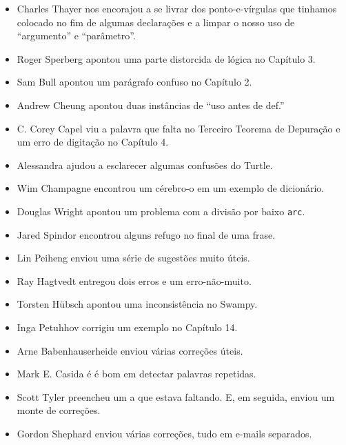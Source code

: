 \documentclass[10pt]{book}
\begin{document}
\begin {itemize}
\item Charles Thayer nos encorajou a se livrar dos ponto-e-vírgulas %
que tinhamos colocado no fim de algumas declarações e a limpar o nosso
uso de ``argumento'' e ``parâmetro''.

\item Roger Sperberg apontou uma parte distorcida de lógica no Capítulo 3. %

\item Sam Bull apontou um parágrafo confuso no Capítulo 2. %

\item Andrew Cheung apontou duas instâncias de ``uso antes de def.'' %

\item C. Corey Capel viu a palavra que falta no Terceiro Teorema
de Depuração e um erro de digitação no Capítulo 4.

\item Alessandra ajudou a esclarecer algumas confusões do Turtle.

\item Wim Champagne encontrou um cérebro-o em um exemplo de dicionário. %

\item Douglas Wright apontou um problema com a divisão por baixo %
{\tt arc}.

\item Jared Spindor encontrou alguns refugo no final de uma frase. %

\item Lin Peiheng enviou uma série de sugestões muito úteis.

\item Ray Hagtvedt entregou dois erros e um erro-não-muito. %

\item Torsten H\"{u}bsch apontou uma inconsistência no Swampy. %

\item Inga Petuhhov corrigiu um exemplo no Capítulo 14.

\item Arne Babenhauserheide enviou várias correções úteis.

\item Mark E. Casida é é bom em detectar palavras repetidas.

\item Scott Tyler preencheu um a que estava faltando. E, em seguida, enviou
um monte de correções. %

\item Gordon Shephard enviou várias correções, tudo em e-mails
separados.


\end{itemize}
\end{document}
